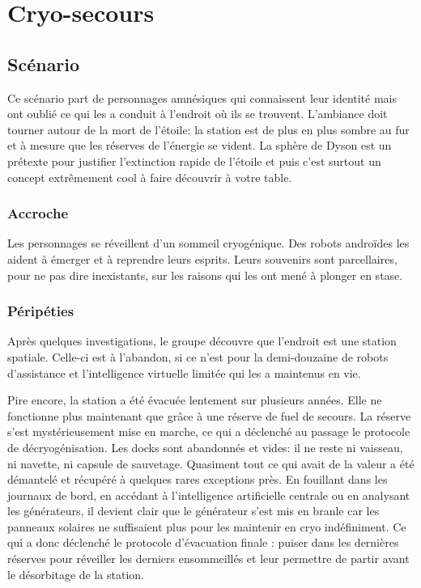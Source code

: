 \chapter{Cryo-secours}

\section{Scénario}

Ce scénario part de personnages amnésiques qui connaissent leur identité mais ont oublié ce qui les a conduit à l'endroit où ils se trouvent.
L'ambiance doit tourner autour de la mort de l'étoile: la station est de plus en plus sombre au fur et à mesure que les réserves de l'énergie se vident.
La sphère de Dyson est un prétexte pour justifier l'extinction rapide de l'étoile et puis c'est surtout un concept extrêmement cool à faire découvrir à votre table.

\subsection{Accroche}

Les personnages se réveillent d'un sommeil cryogénique.
Des robots androïdes les aident à émerger et à reprendre leurs esprits.
Leurs souvenirs sont parcellaires, pour ne pas dire inexistants, sur les raisons qui les ont mené à plonger en stase.

\subsection{Péripéties}

Après quelques investigations, le groupe découvre que l'endroit est une station spatiale.
Celle-ci est à l'abandon, si ce n'est pour la demi-douzaine de robots d'assistance et l'intelligence virtuelle limitée qui les a maintenus en vie.

Pire encore, la station a été évacuée lentement sur plusieurs années.
Elle ne fonctionne plus maintenant que grâce à une réserve de fuel de secours.
La réserve s'est mystérieusement mise en marche, ce qui a déclenché au passage le protocole de décryogénisation.
Les docks sont abandonnés et vides: il ne reste ni vaisseau, ni navette, ni capsule de sauvetage.
Quasiment tout ce qui avait de la valeur a été démantelé et récupéré à quelques rares exceptions près.
En fouillant dans les journaux de bord, en accédant à l'intelligence artificielle centrale ou en analysant les générateurs, il devient clair que le générateur s'est mis en branle car les panneaux solaires ne suffisaient plus pour les maintenir en cryo indéfiniment.
Ce qui a donc déclenché le protocole d'évacuation finale : puiser dans les dernières réserves pour réveiller les derniers ensommeillés et leur permettre de partir avant le désorbitage de la station.

